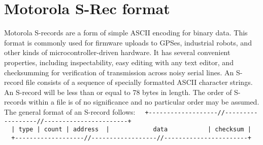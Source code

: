         \section{Motorola S-Rec format}
            Motorola S-records are a form of simple ASCII encoding for binary data. This format is commonly used for firmware uploads to GPSes, industrial robots, and other kinds of microcontroller-driven hardware. It has
            several convenient properties, including inspectability, easy editing with any text editor, and checksumming for verification of transmission across noisy serial lines. An S-record file consists of a sequence of specially formatted ASCII character strings. An S-record will be less than or equal to 78 bytes in length. The order of S-records within a file is of no significance and no particular order may be assumed.\\
            The general format of an S-record follows:
            {
                \usecodefont
                \verb'  +-------------------//------------------//-----------------------+'\\
                \verb'  | type | count | address  |            data           | checksum |'\\
                \verb'  +-------------------//------------------//-----------------------+'\\
            }

